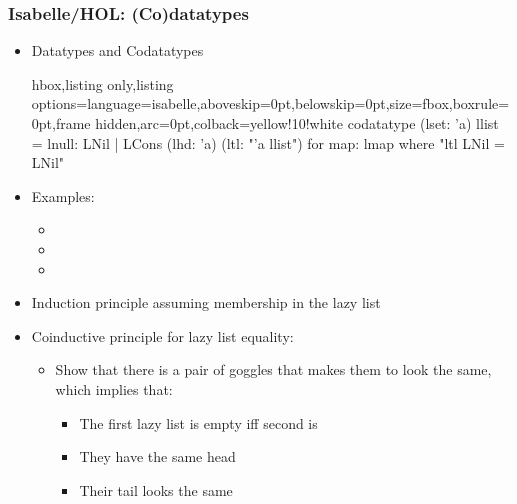 \documentclass[aspectratio=169,10pt]{beamer}
\begin{document}
\begin{frame}[fragile]
  \frametitle{Isabelle/HOL: (Co)datatypes}
  \begin{itemize}
    \item Datatypes and Codatatypes
\vspace*{-1ex}
          \begin{tcblisting}{hbox,listing only,listing options={language=isabelle,aboveskip=0pt,belowskip=0pt},size=fbox,boxrule=0pt,frame hidden,arc=0pt,colback=yellow!10!white}
codatatype (lset: 'a) llist = lnull: LNil | LCons (lhd: 'a) (ltl: "'a llist")
  for map: lmap where "ltl LNil = LNil"
          \end{tcblisting}
\vspace*{-1ex}
    \item Examples:
          \begin{itemize}
            \item {}
            \item {}
            \item {}
          \end{itemize}
\vspace*{-1ex}
          \pause
    \item Induction principle assuming membership in the lazy list
          \pause
    \item Coinductive principle for lazy list equality:
          \begin{itemize}
            \item Show that there is a pair of goggles that makes them to look the same, which implies that:
                  \begin{itemize}
                    \item The first lazy list is empty iff second is
                    \item They have the same head
                    \item Their tail looks the same
                  \end{itemize}
          \end{itemize}
  \end{itemize}
\vspace*{-1ex}
\begin{overlayarea}{\textwidth}{.45\textheight}
  \begin{figure}
    \centering
  \end{figure}
\end{overlayarea}
\end{frame}
\end{document}
